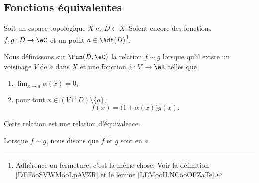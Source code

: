 \subsection{Fonctions équivalentes}

\begin{propositionDef}       \label{DEFooWDSAooKXZsZY}
	Soit un espace topologique \( X\) et \( D\subset X\). Soient encore des fonctions \( f,g\colon D\to \eC\) et un point \( a\in\Adh(D)\)\footnote{Adhérence ou fermeture, c'est la même chose. Voir la définition \ref{DEFooSVWMooLpAVZR} et le lemme \ref{LEMooILNCooOFZaTe}.}.

	Nous définissons sur \( \Fun(D,\eC)\) la relation \( f\sim g\) lorsque qu'il existe un voisinage \( V\) de \( a\) dans \( X\) et une fonction \( \alpha\colon V\to \eR\) telles que
	\begin{enumerate}
		\item
		      \( \lim_{x\to a} \alpha(x)=0\),
		\item
		      pour tout \( x\in (V\cap D)\setminus\{ a \}\),
		      \begin{equation}        \label{EQooQXKYooSDPpNq}
			      f(x)=\big( 1+\alpha(x) \big)g(x).
		      \end{equation}
	\end{enumerate}
	Cette relation est une relation d'équivalence.

	Lorsque \( f\sim g\), nous disons que \( f\) et \( g\) sont  en \( a\).
\end{propositionDef}

